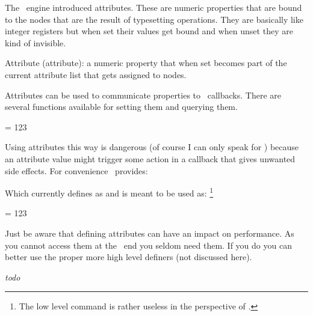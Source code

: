 \startsection[title={\LUATEX\ primitives}]

The \LUATEX\ engine introduced attributes. These are numeric properties that are
bound to the nodes that are the result of typesetting operations. They are
basically like integer registers but when set their values get bound and when
unset they are kind of invisible.

\startitemize
\startitem
    Attribute (attribute): a numeric property that when set becomes part of the
    current attribute list that gets assigned to nodes.
\stopitem
\stopitemize

Attributes can be used to communicate properties to \LUA\ callbacks. There are
several functions available for setting them and querying them.

\starttyping[option=TEX]
 = 123
\stoptyping

Using attributes this way is dangerous (of course I can only speak for \CONTEXT)
because an attribute value might trigger some action in a callback that gives
unwanted side effects. For convenience \CONTEXT\ provides:

\startbuffer
\newattribute\MyAttribute
\stopbuffer

\typebuffer[option=TEX] \getbuffer

Which currently defines \type {\MyAttribute} as {\tt \meaning\MyAttribute} and is
meant to be used as: \footnote {The low level \type {\attributedef} command is
rather useless in the perspective of \CONTEXT.}

\starttyping[option=TEX]
\attribute\MyAttribute = 123
\stoptyping

Just be aware that defining attributes can have an impact on performance. As you
cannot access them at the \TEX\ end you seldom need them. If you do you can
better use the proper more high level definers (not discussed here).

\stopsection

\startsection[title={\LUAMETATEX\ primitives}]

{\em todo}

\stopsection

\stopdocument

